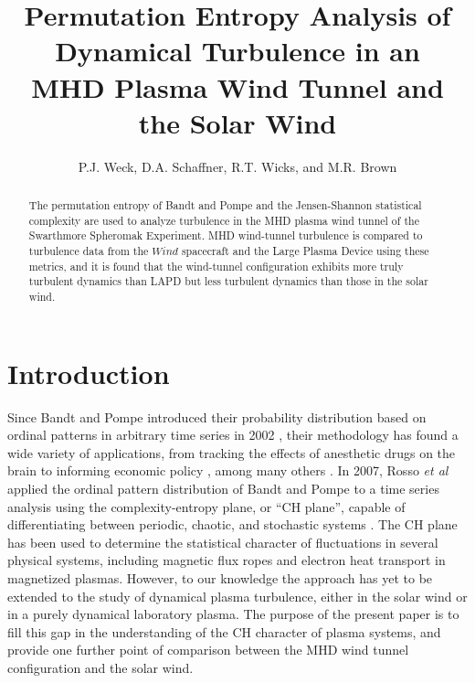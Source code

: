 \documentclass[aps,twocolumn,secnumarabic,nobalancelastpage,amsmath,amssymb,
nofootinbib]{revtex4-1}
\begin{document}
\title{Permutation Entropy Analysis of Dynamical Turbulence in an  \\MHD Plasma Wind Tunnel and the Solar Wind}
\author{P.J. Weck, D.A. Schaffner, R.T. Wicks, and M.R. Brown}
\begin{abstract}
The permutation entropy of Bandt and Pompe and the Jensen-Shannon statistical complexity are used to analyze turbulence in the MHD plasma wind tunnel of the Swarthmore Spheromak Experiment. MHD wind-tunnel turbulence is compared to turbulence data from the $\textit{Wind} $ spacecraft and the Large Plasma Device using these metrics, and it is found that the wind-tunnel configuration exhibits more truly turbulent dynamics than LAPD but less turbulent dynamics than those in the solar wind.
\end{abstract}
\maketitle

\section{Introduction}
Since Bandt and Pompe introduced their probability distribution based on ordinal patterns in arbitrary time series in 2002 \cite{bandt2002}, their methodology has found a wide variety of applications, from tracking the effects of anesthetic drugs on the brain \cite{li2010,jordan2008,olofsen2008} to informing economic policy \cite{bariviera2013,zunino2010,zunino2011}, among many others \cite{kowalski2007,soriano2011,saco2010,suyal2012,sun2010}. In 2007, Rosso \textit{et al} applied the ordinal pattern distribution of Bandt and Pompe to a time series analysis using the complexity-entropy plane, or “CH plane”, capable of differentiating between periodic, chaotic, and stochastic systems \cite{rosso2007}. The CH plane has been used to determine the statistical character of fluctuations in several physical systems, including magnetic flux ropes \cite{gekelman2014} and electron heat transport \cite{maggs2013} in magnetized plasmas. However, to our knowledge the approach has yet to be extended to the study of dynamical plasma turbulence, either in the solar wind or in a purely dynamical laboratory plasma. The purpose of the present paper is to fill this gap in the understanding of the CH character of plasma systems, and provide one further point of comparison between the MHD wind tunnel configuration and the solar wind.
\end{document}
